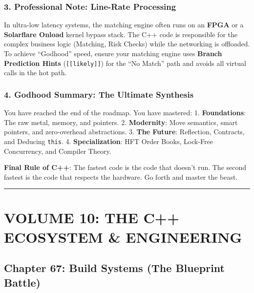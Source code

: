 \hypertarget{professional-note-line-rate-processing}{%
\subsubsection{3. Professional Note: Line-Rate
Processing}\label{professional-note-line-rate-processing}}

In ultra-low latency systems, the matching engine often runs on an
\textbf{FPGA} or a \textbf{Solarflare Onload} kernel bypass stack. The
C++ code is responsible for the complex business logic (Matching, Risk
Checks) while the networking is offloaded. To achieve ``Godhood'' speed,
ensure your matching engine uses \textbf{Branch Prediction Hints}
(\passthrough{\lstinline![[likely]]!}) for the ``No Match'' path and
avoids all virtual calls in the hot path.

\hypertarget{godhood-summary-the-ultimate-synthesis}{%
\subsubsection{4. Godhood Summary: The Ultimate
Synthesis}\label{godhood-summary-the-ultimate-synthesis}}

You have reached the end of the roadmap. You have mastered: 1.
\textbf{Foundations}: The raw metal, memory, and pointers. 2.
\textbf{Modernity}: Move semantics, smart pointers, and zero-overhead
abstractions. 3. \textbf{The Future}: Reflection, Contracts, and
Deducing \passthrough{\lstinline!this!}. 4. \textbf{Specialization}: HFT
Order Books, Lock-Free Concurrency, and Compiler Theory.

\textbf{Final Rule of C++}: The fastest code is the code that doesn't
run. The second fastest is the code that respects the hardware. Go forth
and master the beast.

\begin{center}\rule{0.5\linewidth}{0.5pt}\end{center}

\hypertarget{volume-10-the-c-ecosystem-engineering}{%
\section{VOLUME 10: THE C++ ECOSYSTEM \&
ENGINEERING}\label{volume-10-the-c-ecosystem-engineering}}

\hypertarget{chapter-67-build-systems-the-blueprint-battle}{%
\subsection{Chapter 67: Build Systems (The Blueprint
Battle)}\label{chapter-67-build-systems-the-blueprint-battle}}

